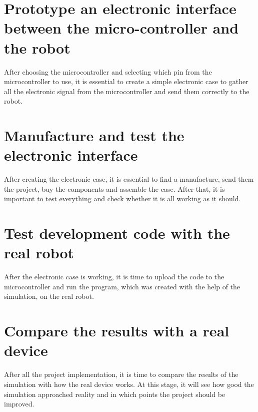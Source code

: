 \documentclass[../monografia.tex]{subfiles}
\begin{document}
\section{Prototype an electronic interface between the micro-controller and the robot}

After choosing the microcontroller and selecting which pin from the microcontroller to use, it is essential to create a simple electronic case to gather all the electronic signal from the microcontroller and send them correctly to the robot.

\section{Manufacture and test the electronic interface}

After creating the electronic case, it is essential to find a manufacture, send them the project, buy the components and assemble the case. After that, it is important to test everything and check whether it is all working as it should. 

\section{Test development code with the real robot}

After the electronic case is working, it is time to upload the code to the microcontroller and run the program, which was created with the help of the simulation, on the real robot. 

\section{Compare the results with a real device}
After all the project implementation, it is time to compare the results of the simulation with how the real device works. At this stage, it will see how good  the simulation approached reality and in which points the project should be improved.
\end{document}
